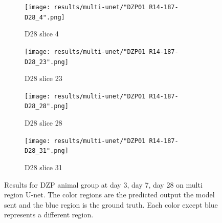 \begin{figure}[!htb]
\medskip
\begin{subfigure}{0.25\textwidth}
  \texttt{[image: results/multi-unet/"DZP01 R14-187-D28\_4".png]}
  \caption{D28 slice 4}
\end{subfigure}\hfil %
\begin{subfigure}{0.25\textwidth}
  \texttt{[image: results/multi-unet/"DZP01 R14-187-D28\_23".png]}
  \caption{D28 slice 23}
\end{subfigure}\hfil %
\begin{subfigure}{0.25\textwidth}
  \texttt{[image: results/multi-unet/"DZP01 R14-187-D28\_28".png]}
  \caption{D28 slice 28}
\end{subfigure}\hfil %
\begin{subfigure}{0.25\textwidth}
  \texttt{[image: results/multi-unet/"DZP01 R14-187-D28\_31".png]}
  \caption{D28 slice 31}
\end{subfigure}
  
  \caption{Results for DZP animal group at day 3, day 7, day 28 on multi region U-net. The color regions are the predicted output the model sent and the blue region is the ground truth. Each color except blue represents a different region.}
  \label{fig:results_multi_unet_DZP}
\end{figure}


